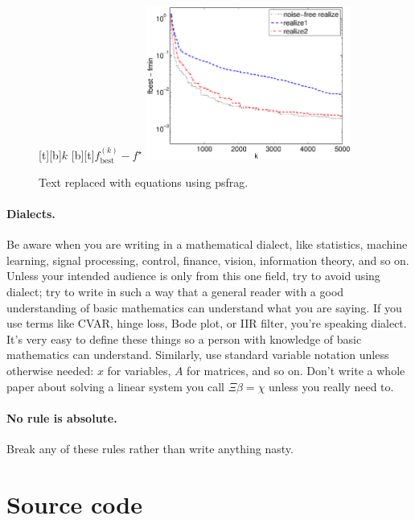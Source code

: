 \documentclass[12pt]{article}
\begin{document}
\begin{figure}
\begin{center}
[t][b]{$k$}
[b][t]{$f_\mathrm{best}^{(k)} - f^\star$}
\includegraphics[width=0.6\textwidth]{figures/pwl_error_fbest_realize}
\end{center}
\caption{Text replaced with equations using psfrag.}
\label{f-psfrag}
\end{figure}

\paragraph{Dialects.}
Be aware when you are writing in a mathematical dialect, like statistics,
machine learning, signal processing, control, finance, vision, information
theory, and so on.  Unless your intended audience is only from this one field,
try to avoid using dialect; try to write in such a way that a general reader
with a good understanding of basic mathematics can understand what you are
saying.  If you use terms like CVAR, hinge loss, Bode plot, or IIR filter,
you're speaking dialect. It's very easy to define these things so a person with
knowledge of basic mathematics can understand. Similarly, use standard variable
notation unless otherwise needed: $x$ for variables, $A$ for matrices, and so
on. Don't write a whole paper about solving a linear system you call $\Xi \beta =
\chi$ unless you really need to.

\paragraph{No rule is absolute.}
Break any of these rules rather than write anything nasty.

\section{Source code}
\end{document}
